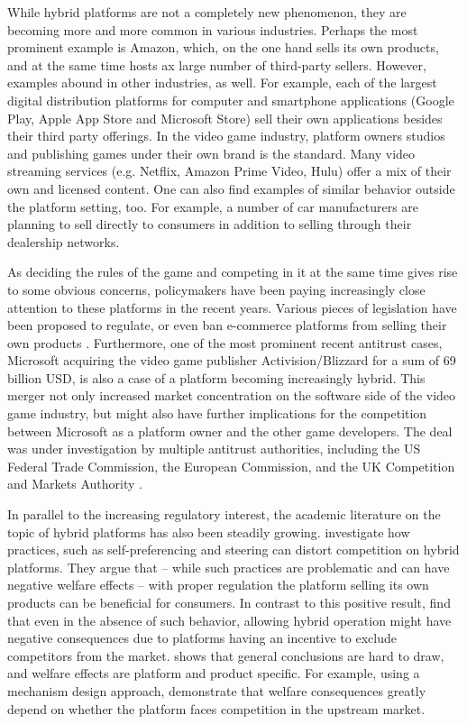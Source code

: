 \documentclass[a4paper]{article}
\begin{document}
While hybrid platforms are not a completely new phenomenon, they are becoming more and more common in various industries.
Perhaps the most prominent example is Amazon, which, on the one hand sells its own products, and at the same time hosts ax large number of third-party sellers.
However, examples abound in other industries, as well.
For example, each of the largest digital distribution platforms for computer and smartphone applications (Google Play, Apple App Store and Microsoft Store) sell their own applications besides their third party offerings.
In the video game industry, platform owners studios and publishing games under their own brand is the standard.
Many video streaming services (e.g. Netflix, Amazon Prime Video, Hulu) offer a mix of their own and licensed content.
One can also find examples of similar behavior outside the platform setting, too.
For example, a number of car manufacturers are planning to sell directly to consumers in addition to selling through their dealership networks.

As deciding the rules of the game and competing in it at the same time gives rise to some obvious concerns, policymakers have been paying increasingly close attention to these platforms in the recent years.
Various pieces of legislation have been proposed to regulate, or even ban e-commerce platforms from selling their own products \parencite[][]{phartiyal_2019,reynolds_2022,eu-2022}.
Furthermore, one of the most prominent recent antitrust cases, Microsoft acquiring the video game publisher Activision/Blizzard for a sum of 69 billion USD, is also a case of a platform becoming increasingly hybrid.
This merger not only increased market concentration on the software side of the video game industry, but might also have further implications for the competition between Microsoft as a platform owner and the other game developers.
The deal was under investigation by multiple antitrust authorities, including the US Federal Trade Commission, the European Commission, and the UK Competition and Markets Authority \parencite{livni_merced_2023}.

In parallel to the increasing regulatory interest, the academic literature on the topic of hybrid platforms has also been steadily growing.
\textcite{hagiu2022should} investigate how practices, such as self-preferencing and steering can distort competition on hybrid platforms.
They argue that -- while such practices are problematic and can have negative welfare effects -- with proper regulation the platform selling its own products can be beneficial for consumers.
In contrast to this positive result, \textcite[]{anderson2021hybrid} find that even in the absence of such behavior, allowing hybrid operation might have negative consequences due to platforms having an incentive to exclude competitors from the market.
\textcite[]{gutierrez2021welfare} shows that general conclusions are hard to draw, and welfare effects are platform and product specific.
For example, using a mechanism design approach, \textcite{kang2022contracting} demonstrate that welfare consequences greatly depend on whether the platform faces competition in the upstream market.
\end{document}
